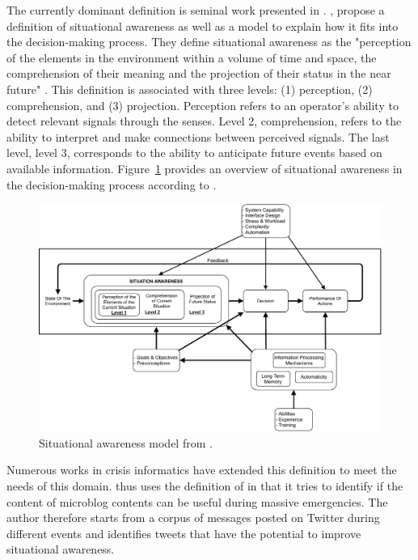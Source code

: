 The currently dominant definition is seminal work presented in \parencite{endsleyTheorySituationAwareness1995}.
\citeauthor{endsleyTheorySituationAwareness1995}, propose a definition of situational awareness as well as a model to explain how it fits into the decision-making process.
They define situational awareness as the "perception of the elements in the environment within a volume of time and space, the comprehension of their meaning and the projection of their status in the near future" \parencite[p. 36]{kropczynskiIdentifyingActionableInformation2018}.
This definition is associated with three levels: (1) perception, (2) comprehension, and (3) projection.
Perception refers to an operator's ability to detect relevant signals through the senses.
Level 2, comprehension, refers to the ability to interpret and make connections between perceived signals.
The last level, level 3, corresponds to the ability to anticipate future events based on available information.
Figure~\ref{information:SA} provides an overview of situational awareness in the decision-making process according to \parencite{endsleyTheorySituationAwareness1995}.

\begin{figure}
    \centering
    \includegraphics[width=\textwidth]{figures/chap-3/Endsley-1995.pdf}
    \caption{Situational awareness model from \textcite{endsleyTheorySituationAwareness1995}.}
    \label{information:SA}
\end{figure}

Numerous works in crisis informatics have extended this definition to meet the needs of this domain.
\textcite{viewegSituationalAwarenessMass2012} thus uses the definition of \textcite{endsleyTheorySituationAwareness1995} in that it tries to identify if the content of microblog contents can be useful during massive emergencies.
The author therefore starts from a corpus of messages posted on Twitter during different events and identifies tweets that have the potential to improve situational awareness.

